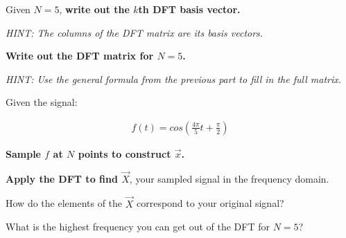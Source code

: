 \begin{enumerate}

\qitem
Given $N = 5$, { \bf write out the $k$th DFT basis vector. }

{\em HINT:
The columns of the DFT matrix are its basis vectors.
}

\sol{

}

\qitem 
{ \bf Write out the DFT matrix for $N = 5$. }

{\em HINT:
Use the general formula from the previous part to fill in the full matrix.
}

\sol{
}


\qitem

Given the signal:

\begin{align*}
f(t) = cos(\frac{4\pi}{5}t + \frac{\pi}{2})
\end{align*}

{\bf Sample $f$ at $N$ points to construct $\vec{x}$. }

\sol{
}

\qitem
{\bf Apply the DFT to find $\vec{X}$}, your sampled signal in the frequency domain.

\sol{
}

\qitem
How do the elements of the $\vec{X}$ correspond to your original signal?

\sol{
}

\qitem
What is the highest frequency you can get out of the DFT for $N = 5$?

\sol{
}

\end{enumerate}


